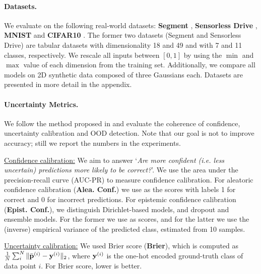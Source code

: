 \paragraph{Datasets.} We evaluate on the following real-world datasets: \textbf{Segment} \cite{uci_datasets}, \textbf{Sensorless Drive} \cite{uci_datasets}, \textbf{MNIST} \cite{mnist} and \textbf{CIFAR10} \cite{cifar10}. The former two datasets (Segment and Sensorless Drive) are tabular datasets with %
dimensionality 18 and 49 and with 7 and 11 classes, respectively. We rescale all inputs between $[0, 1]$ by using the $\min$ and $\max$ value of each dimension from the training set. Additionally, we compare all models on 2D synthetic data composed of three Gaussians each. Datasets are presented in  more detail in the appendix.

\paragraph{Uncertainty Metrics.} We follow the method proposed in \cite{dataset-shift} and evaluate the coherence of confidence, uncertainty calibration and OOD detection. Note that our goal is not to improve accuracy; still we report the numbers in the experiments.

\underline{Confidence calibration:} We aim to answer `\textit{Are more confident (i.e. less uncertain) predictions more likely to be correct?}'. We use the area under the precision-recall curve (AUC-PR) to measure confidence calibration. For aleatoric confidence calibration (\textbf{Alea. Conf.}) we use  as the scores with labels 1 for correct and 0 for incorrect predictions. For epistemic confidence calibration (\textbf{Epist. Conf.}), we distinguish Dirichlet-based models, and dropout and ensemble models. For the former we use \smash{$\underset{\iclass}{\max}\; \bm{\alpha}_\iclass\dataix$} as scores, and for the latter we use the (inverse) empirical variance  of the predicted class, estimated from 10 samples.

\underline{Uncertainty calibration:} We used Brier score (\textbf{Brier}), which is computed as $\frac{1}{N}\sum_{i}^N \|\bar{\mathbf{p}}^{(i)} - \mathbf{y}^{(i)}\|_2$, where $\mathbf{y}^{(i)}$ is the one-hot encoded ground-truth class of data point $i$. For Brier score, lower is better.

